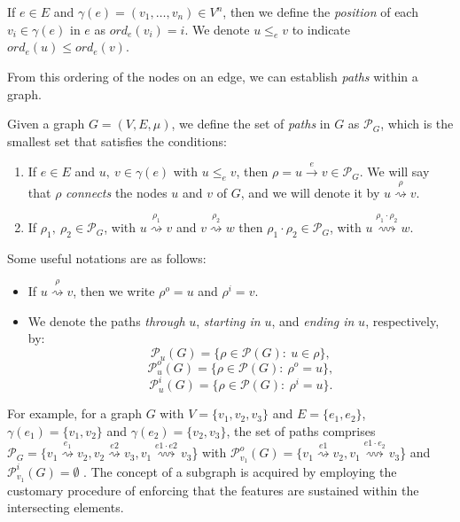 \documentclass{article}%
\begin{document}
\begin{definition}{}
If $e\in E$ and $\gamma(e)=(v_1,\dots,v_n)\in V^n$, then we define the \emph{position} of each $v_i\in \gamma(e)$ in $e$ as $ord_e(v_i)=i$. We denote $u\leq_e v$ to indicate $ord_e(u)\leq ord_e(v)$.
\end{definition}

From this ordering of the nodes on an edge, we can establish \textit{paths} within a graph.

\begin{definition}{}
Given a graph $G=(V,E,\mu)$, we define the set of \emph{paths} in $G$ as $\mathcal{P}_G$, which is the smallest set that satisfies the conditions:
\begin{enumerate}
    \item If $e\in E$ and $u,\ v\in \gamma (e)$ with $u \leq_e v$, then $\rho=u \stackrel{e}{\rightarrow} v\in \mathcal{P}_G$. We will say that $\rho$ \emph{connects} the nodes $u$ and $v$ of $G$, and we will denote it by $u \stackrel{\rho}{\rightsquigarrow} v$.
    \item If $\rho_1,\ \rho_2\in \mathcal{P}_G$, with $u \stackrel{\rho_1}{\rightsquigarrow} v$ and $v \stackrel{\rho_2}{\rightsquigarrow} w$ then $\rho_1\cdot\rho_2 \in \mathcal{P}_G$, with $u \stackrel{\rho_1\cdot\rho_2}{\rightsquigarrow} w$.
\end{enumerate}
\end{definition}\medskip

Some useful notations are as follows:
	\begin{itemize}
	\item If $u \stackrel{\rho}{\rightsquigarrow} v$, then we write $\rho^o=u$ and $\rho^i=v$.
	\item We denote the paths \textit{through} $u$, \textit{starting in} $u$, and \textit{ending in} $ u$, respectively, by:
	$$\mathcal{P}_u(G)=\{\rho \in \mathcal{P}(G):\ u\in \rho\},$$
	$$\mathcal{P}_u^o(G)=\{\rho \in \mathcal{P}(G):\ \rho^o=u\},$$
	$$\mathcal{P}_u^i(G)=\{\rho \in \mathcal{P}(G):\ \rho^i=u\}.$$
\end{itemize}
For example, for a graph $G$ with $V=\{v_1,v_2,v_3\}$ and $E=\{e_1,e_2\}$, $\gamma(e_1) = \{v_1,v_2\}$ and $\gamma(e_2) = \{v_2,v_3\}$, the set of paths comprises $ \mathcal{P}_G = \{ v_1 \stackrel{e_1}{\rightsquigarrow}  v_2,v_2 \stackrel{e2}{\rightsquigarrow}  v_3,v_1 \stackrel{e1\cdot e2}{\rightsquigarrow}  v_3$\} with $\mathcal{P}^o_{v_1}(G)=\{ v_1 \stackrel{e1}{\rightsquigarrow}  v_2,v_1 \stackrel{e1\cdot e_2}{\rightsquigarrow}  v_3$\} and  $\mathcal{P}^i_{v_1}(G)=\emptyset$ .
The concept of a subgraph is acquired by employing the customary procedure of enforcing that the features are sustained within the intersecting elements.
\end{document}
